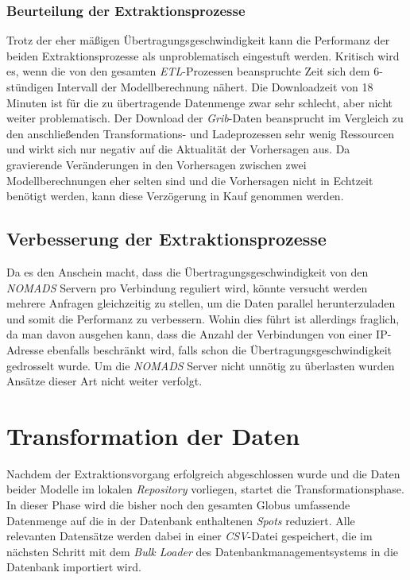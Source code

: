 \subsubsection{Beurteilung der Extraktionsprozesse}
Trotz der eher mäßigen Übertragungsgeschwindigkeit kann die Performanz
der beiden Extraktionsprozesse als unproblematisch eingestuft
werden. Kritisch wird es, wenn die von den gesamten
\textit{ETL}-Prozessen beanspruchte Zeit sich dem 6-stündigen
Intervall der Modellberechnung nähert. Die Downloadzeit von 18 Minuten
ist für die zu übertragende Datenmenge zwar sehr schlecht, aber nicht
weiter problematisch. Der Download der \textit{Grib}-Daten beansprucht
im Vergleich zu den anschließenden Transformations- und Ladeprozessen
sehr wenig Ressourcen und wirkt sich nur negativ auf die Aktualität
der Vorhersagen aus. Da gravierende Veränderungen in den Vorhersagen
zwischen zwei Modellberechnungen eher selten sind und die Vorhersagen
nicht in Echtzeit benötigt werden, kann diese Verzögerung in Kauf
genommen werden.

\subsection{Verbesserung der Extraktionsprozesse}
Da es den Anschein macht, dass die Übertragungsgeschwindigkeit von den
\textit{NOMADS} Servern pro Verbindung reguliert wird, könnte versucht
werden mehrere Anfragen gleichzeitig zu stellen, um die Daten parallel
herunterzuladen und somit die Performanz zu verbessern. Wohin dies
führt ist allerdings fraglich, da man davon ausgehen kann, dass die
Anzahl der Verbindungen von einer IP-Adresse ebenfalls beschränkt
wird, falls schon die Übertragungsgeschwindigkeit gedrosselt wurde. Um
die \textit{NOMADS} Server nicht unnötig zu überlasten wurden Ansätze
dieser Art nicht weiter verfolgt.

\section{Transformation der Daten}
Nachdem der Extraktionsvorgang erfolgreich abgeschlossen wurde und die
Daten beider Modelle im lokalen \textit{Repository} vorliegen, startet
die Transformationsphase. In dieser Phase wird die bisher noch den
gesamten Globus umfassende Datenmenge auf die in der Datenbank
enthaltenen \textit{Spots} reduziert. Alle relevanten Datensätze
werden dabei in einer \textit{CSV}-Datei
 gespeichert, die im
nächsten Schritt mit dem \textit{Bulk Loader} des
Datenbankmanagementsystems in die Datenbank importiert wird.

